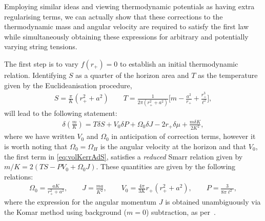 \documentclass[
twoside,
openright,
frontopenright,
]{dmathesis}
\begin{document}
Employing similar ideas and viewing thermodynamic potentials as having extra
regularising terms, we can actually show that these corrections to the
thermodynamic mass and angular velocity are required to satisfy the first law
while simultaneously obtaining these expressions for arbitrary and potentially
varying string tensions.

The first step is to vary $f(r_+)=0$ to establish an initial thermodynamic
relation. Identifying $S$ as a quarter of the horizon area and $T$ as the
temperature given by the Euclideanisation procedure,
\begin{align} \label{eq:SandT-al}
S = \frac{\pi}{K}(r_+^2+a^2) \qquad
  T=\frac{1}{2\pi(r_{+}^{2}+a^{2})}
  \bigg[m-\frac{a^{2}}{r_{+}}+\frac{r_{+}^{3}}{\ell^{2}}\bigg], 
\end{align}
will lead to the following statement:
\begin{align}\label{eq:master-al}
\delta\left(\frac{m}{K}\right)=T\delta S +V_0\delta P + \Omega_0\delta J -
  2r_+\delta\mu + \frac{m\delta K}{2K^2},
\end{align}
where we have written $V_0$ and $\Omega_0$ in anticipation of correction terms,
however it is worth noting that $\Omega_0=\Omega_H$ is the angular velocity at
the horizon and that $V_0$, the first term in \cref{eq:volKerrAdS}, satisfies a
\emph{reduced} Smarr relation given by $m/K = 2(TS-PV_0+\Omega_0 J)$. These
quantities are given by the following relations:
\begin{align} \label{eq:horpotentials-al}
\Omega_0 =  \frac{a K}{r_{+}^{2}+a^{2}}, \qquad J=\frac{ma}{K^2}, \qquad V_0 =
  \frac{4\pi}{3K}r_+(r_+^2+a^2), \qquad P = \frac{3}{8\pi\ell^2}, 
\end{align}
where the expression for the angular momentum $J$ is obtained unambiguously via
the Komar method using background ($m=0$) subtraction, as
per~\cite{Magnon:1985sc}.
\end{document}
